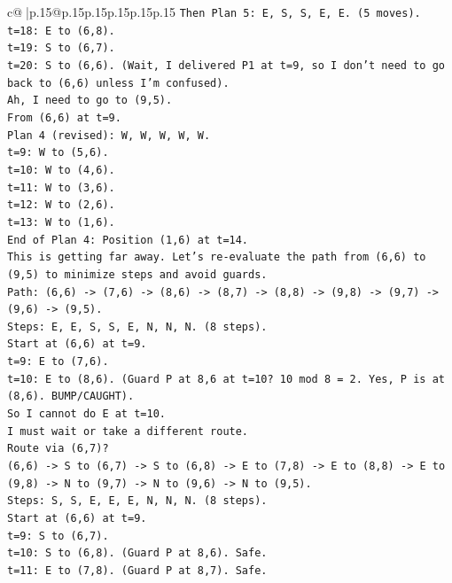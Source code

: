 \documentclass{article}
\begin{document}
{\begin{supertabular}{c@{$\;$}|p{.15\linewidth}@{}p{.15\linewidth}p{.15\linewidth}p{.15\linewidth}p{.15\linewidth}p{.15\linewidth}}
{{{\texttt{Then Plan 5: E, S, S, E, E. (5 moves).} \\
\texttt{t=18: E to (6,8).} \\
\texttt{t=19: S to (6,7).} \\
\texttt{t=20: S to (6,6). (Wait, I delivered P1 at t=9, so I don't need to go back to (6,6) unless I'm confused).} \\
\texttt{Ah, I need to go to (9,5).} \\
\texttt{From (6,6) at t=9.} \\
\texttt{Plan 4 (revised): W, W, W, W, W.} \\
\texttt{t=9: W to (5,6).} \\
\texttt{t=10: W to (4,6).} \\
\texttt{t=11: W to (3,6).} \\
\texttt{t=12: W to (2,6).} \\
\texttt{t=13: W to (1,6).} \\
\texttt{End of Plan 4: Position (1,6) at t=14.} \\
\texttt{This is getting far away. Let's re{-}evaluate the path from (6,6) to (9,5) to minimize steps and avoid guards.} \\
\texttt{Path: (6,6) {-}> (7,6) {-}> (8,6) {-}> (8,7) {-}> (8,8) {-}> (9,8) {-}> (9,7) {-}> (9,6) {-}> (9,5).} \\
\texttt{Steps: E, E, S, S, E, N, N, N. (8 steps).} \\
\texttt{Start at (6,6) at t=9.} \\
\texttt{t=9: E to (7,6).} \\
\texttt{t=10: E to (8,6). (Guard P at 8,6 at t=10? 10 mod 8 = 2. Yes, P is at (8,6). BUMP/CAUGHT).} \\
\texttt{So I cannot do E at t=10.} \\
\texttt{I must wait or take a different route.} \\
\texttt{Route via (6,7)?} \\
\texttt{(6,6) {-}> S to (6,7) {-}> S to (6,8) {-}> E to (7,8) {-}> E to (8,8) {-}> E to (9,8) {-}> N to (9,7) {-}> N to (9,6) {-}> N to (9,5).} \\
\texttt{Steps: S, S, E, E, E, N, N, N. (8 steps).} \\
\texttt{Start at (6,6) at t=9.} \\
\texttt{t=9: S to (6,7).} \\
\texttt{t=10: S to (6,8). (Guard P at 8,6). Safe.} \\
\texttt{t=11: E to (7,8). (Guard P at 8,7). Safe.} \\
}}}
\end{supertabular}}
\end{document}
